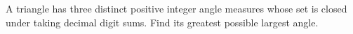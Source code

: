 A triangle has three distinct positive integer angle measures whose set is closed under taking decimal digit sums. Find its greatest possible largest angle.
